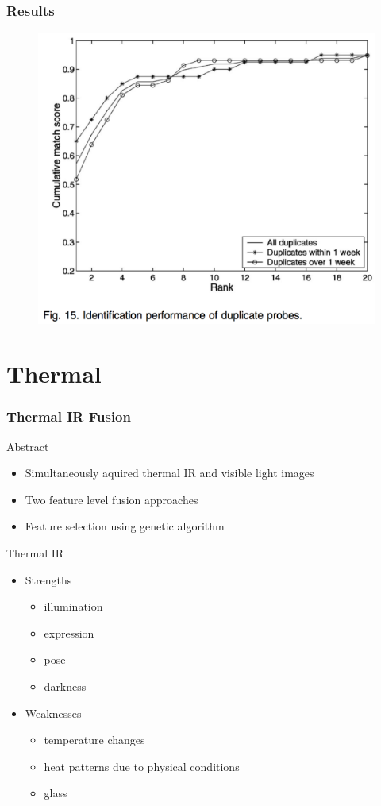 \documentclass{beamer}
\begin{document}
\begin{frame}
\frametitle{Results}
\begin{figure}
\includegraphics[height=0.8\textheight]{hyperspectralResults2}
\end{figure}
\end{frame}

\section{Thermal}
\begin{frame}
\frametitle{Thermal IR Fusion}
\begin{block}{Abstract}
\begin{itemize}
\item Simultaneously aquired thermal IR and visible light images
\item Two feature level fusion approaches
\item Feature selection using genetic algorithm
\end{itemize}
\end{block}
\pause
\begin{block}{Thermal IR}
\begin{itemize}
\item Strengths
\begin{itemize}
\item illumination
\item expression
\item pose
\item darkness
\end{itemize}
\item Weaknesses
\begin{itemize}
\item temperature changes
\item heat patterns due to physical conditions
\item glass
\end{itemize}
\end{itemize} 
\end{block}
\end{frame}
\end{document}
